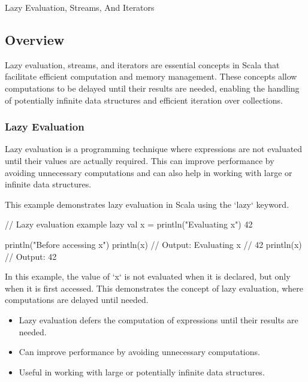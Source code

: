 \begin{notes}{Lazy Evaluation, Streams, And Iterators}
    \subsection*{Overview}

    Lazy evaluation, streams, and iterators are essential concepts in Scala that facilitate efficient computation and memory management. These concepts allow computations to be delayed until their results are needed, enabling the handling of potentially infinite data structures and efficient iteration over collections.
    
    \subsubsection*{Lazy Evaluation}
    
    Lazy evaluation is a programming technique where expressions are not evaluated until their values are actually required. This can improve performance by avoiding unnecessary computations and can also help in working with large or infinite data structures.
    
    \begin{highlight}
    
        This example demonstrates lazy evaluation in Scala using the `lazy` keyword.
    
    \begin{code}[Scala]
    // Lazy evaluation example
    lazy val x = {
        println("Evaluating x")
        42
    }
    
    println("Before accessing x")
    println(x)  // Output: Evaluating x
                //          42
    println(x)  // Output: 42
    \end{code}
    
        In this example, the value of `x` is not evaluated when it is declared, but only when it is first accessed. This demonstrates the concept of lazy evaluation, where computations are delayed until needed.
    
        \begin{itemize}
            \item Lazy evaluation defers the computation of expressions until their results are needed.
            \item Can improve performance by avoiding unnecessary computations.
            \item Useful in working with large or potentially infinite data structures.
        \end{itemize}
    

\end{highlight}
\end{notes}
